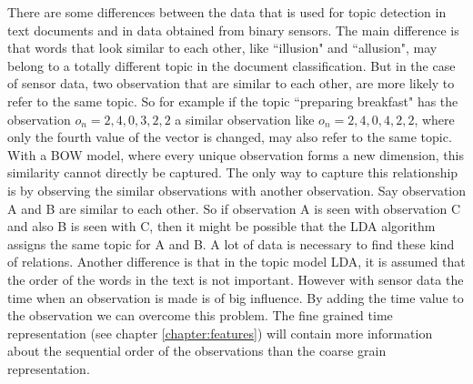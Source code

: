 There are some differences between the data that is used for topic detection in text documents and in data obtained from binary sensors.
The main difference is that words that look similar to each other, like ``illusion" and ``allusion", may belong to a totally different topic in the document classification. But in the case of sensor data, two observation that are similar to each other, are more likely to refer to the same topic. So for example if the topic ``preparing breakfast" has the observation $o_n = {2,4,0,3,2,2}$ a similar observation like $o_n={2,4,0,4,2,2}$, where only the fourth value of the vector is changed, may also refer to the same topic. With a BOW model, where every unique observation forms a new dimension, this similarity cannot directly be captured. The only way to capture this relationship is by observing the similar observations with another observation. Say observation A and B are similar to each other. So if observation A is seen with observation C and also B is seen with C, then it might be possible that the LDA algorithm assigns the same topic for A and B. A lot of data is necessary to find these kind of relations.
Another difference is that in the topic model LDA, it is assumed that the order of the words in the text is not important. However with sensor data the time when an observation is made is of big influence. By adding the time value to the observation we can overcome this problem. The fine grained time representation (see chapter \ref{chapter:features}) will contain more information about the sequential order of the observations than the coarse grain representation.\\


